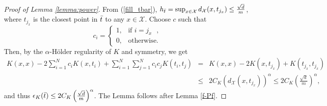 \documentclass{article}
\numberwithin{equation}{section}
\begin{document}
\begin{appendices}
\begin{proof}[Proof of Lemma \ref{lemma:power}]
From (\ref{fill_tbar}), $h_{\Bar{t}} = \sup_{x\in \mathcal{X}} d_\mathcal{X}(x,t_{j_x})\leq  \frac{\sqrt{d}}{m}$, where $t_{j_x}$ is the closest point in $\Bar{t}$ to  any $x\in \mathcal{X}$. Choose $c$ such that 
\begin{equation}
    c_i =  \begin{cases}
      1, & \text{if $i=j_x$ },\\
      0, & \text{otherwise}.
    \end{cases}  
\end{equation}
Then, by the $\alpha$-H\"{o}lder regularity of $K$  and symmetry, we get 
\begin{eqnarray*}
    K(x,x) -2 \sum_{i=1}^N c_i K(x,t_i)+ \sum_{i=1}^N \sum_{j=1}^N c_i  c_j K(t_i, t_j)
    &= & K(x,x) -2  K(x,t_{j_x})+ K(t_{j_x}, t_{j_x})\\
    &\leq& 2C_K (d_\mathcal{X}(x,t_{j_x}))^\alpha \leq 2C_K \left(\frac{\sqrt{d}}{m}\right)^\alpha,
\end{eqnarray*}
and thus 
    $\epsilon_K(\Bar{t}) \leq 2C_K \left(\frac{\sqrt{d}}{m}\right)^\alpha$.
The Lemma follows after Lemma \ref{f-Pf}.
\end{proof}


\end{appendices}
\end{document}
